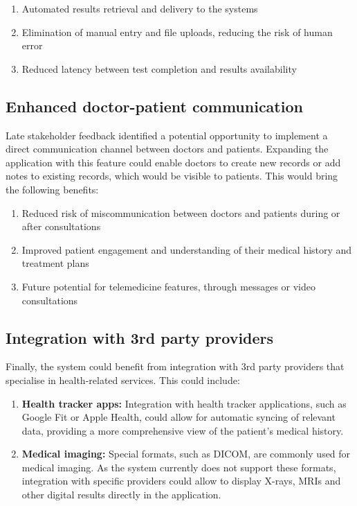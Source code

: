 \begin{enumerate}
    \item Automated results retrieval and delivery to the systems
    \item Elimination of manual entry and file uploads, reducing the risk of human error
    \item Reduced latency between test completion and results availability
\end{enumerate}

\subsection{Enhanced doctor-patient communication}

Late stakeholder feedback identified a potential opportunity to implement a direct communication channel between doctors and patients. Expanding the application with this feature could enable doctors to create new records or add notes to existing records, which would be visible to patients. This would bring the following benefits:

\begin{enumerate}
    \item Reduced risk of miscommunication between doctors and patients during or after consultations
    \item Improved patient engagement and understanding of their medical history and treatment plans
    \item Future potential for telemedicine features, through messages or video consultations
\end{enumerate}

\subsection{Integration with 3rd party providers}

Finally, the system could benefit from integration with 3rd party providers that specialise in health-related services. This could include:

\begin{enumerate}
    \item \textbf{Health tracker apps:} Integration with health tracker applications, such as Google Fit or Apple Health, could allow for automatic syncing of relevant data, providing a more comprehensive view of the patient's medical history.
    \item \textbf{Medical imaging:} Special formats, such as DICOM, are commonly used for medical imaging. As the system currently does not support these formats, integration with specific providers could allow to display X-rays, MRIs and other digital results directly in the application.
\end{enumerate}

